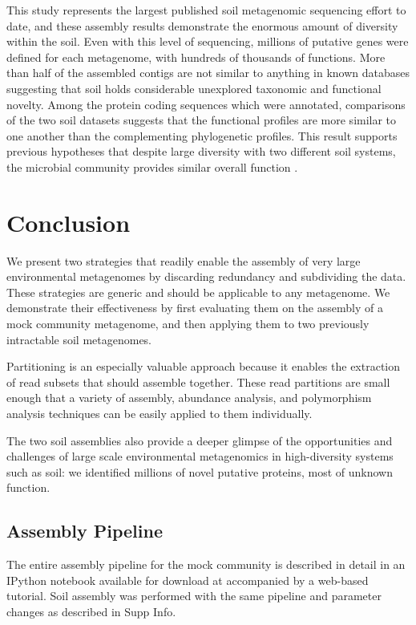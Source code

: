 \documentclass[11pt]{article} %
\begin{document}
This study represents the largest published soil metagenomic sequencing effort
to date, and these assembly results demonstrate the enormous amount of
diversity within the soil.  Even with this level of sequencing,
millions of putative genes were defined for each metagenome, with
hundreds of thousands of functions.
More than half of the assembled contigs are not similar to anything in
known databases suggesting that soil holds considerable unexplored
taxonomic and functional novelty.
Among the
protein coding sequences which were annotated, comparisons of the two
soil datasets suggests that the functional profiles are more similar
to one another than the complementing phylogenetic profiles.  This
result supports previous hypotheses that despite large diversity with
two different soil systems, the microbial community provides similar
overall function \cite{Girvan:2005jv,McGradySteed:1997uj,Muller:2002cd,Konstantinidis:2004hr}.


\section{Conclusion}

We present two strategies that readily enable the assembly of very
large environmental metagenomes by discarding redundancy and
subdividing the data.  These strategies are generic and should
be applicable to any metagenome.  We demonstrate their effectiveness by
first evaluating them on the assembly of a mock community metagenome,
and then applying them to two previously intractable soil metagenomes.

Partitioning is an especially valuable approach because it enables the
extraction of read subsets that should assemble together.  These read
partitions are small enough that a variety of assembly, abundance
analysis, and polymorphism analysis techniques can be easily applied
to them individually.

The two soil assemblies also provide a deeper glimpse of the
opportunities and challenges of large scale environmental metagenomics
in high-diversity systems such as soil: we identified millions of
novel putative proteins, most of unknown function.

\subsection{Assembly Pipeline}
The entire assembly pipeline for the mock community is described in
detail in an IPython notebook available for download at \cite{url2,url1}
accompanied by a web-based tutorial.  Soil assembly was performed with
the same pipeline and parameter changes as described in Supp Info.
\end{document}
